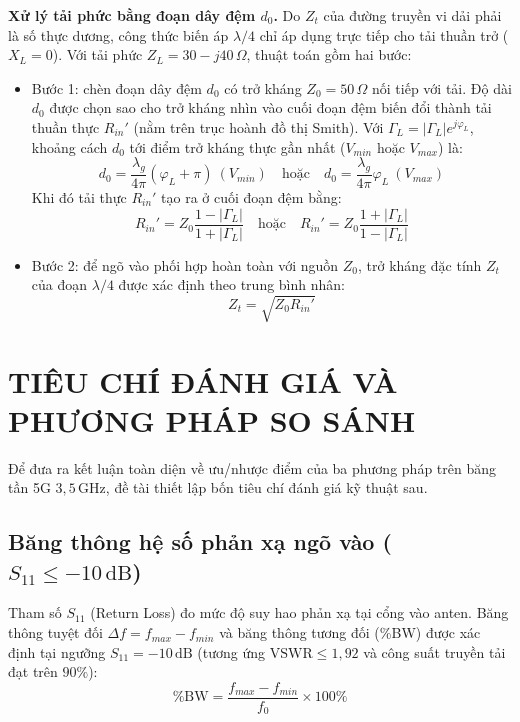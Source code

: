 \documentclass[a4paper]{report}
\newcommand\Zo{Z_0}
\newcommand\ZL{Z_L}
\newcommand\GL{\Gamma_L}
\newcommand\dB{\,\mathrm{dB}}
\newcommand\GHz{\,\mathrm{GHz}}
\begin{document}
\textbf{Xử lý tải phức bằng đoạn dây đệm $d_0$.} Do $Z_t$ của đường truyền vi dải phải là số thực dương, công thức biến áp $\lambda/4$ chỉ áp dụng trực tiếp cho tải thuần trở ($X_L=0$). Với tải phức $\ZL=30-j40\,\Omega$, thuật toán gồm hai bước:
\begin{itemize}
  \item Bước 1: chèn đoạn dây đệm $d_0$ có trở kháng $\Zo=50\,\Omega$ nối tiếp với tải. Độ dài $d_0$ được chọn sao cho trở kháng nhìn vào cuối đoạn đệm biến đổi thành tải thuần thực $R_{in}'$ (nằm trên trục hoành đồ thị Smith). Với $\GL=|\GL|e^{j\varphi_L}$, khoảng cách $d_0$ tới điểm trở kháng thực gần nhất ($V_{min}$ hoặc $V_{max}$) là:
  \begin{equation}
    d_0=\frac{\lambda_g}{4\pi}\left(\varphi_L+\pi\right)\ (V_{min})\quad\text{hoặc}\quad d_0=\frac{\lambda_g}{4\pi}\varphi_L\ (V_{max})
  \end{equation}
  Khi đó tải thực $R_{in}'$ tạo ra ở cuối đoạn đệm bằng:
  \begin{equation}
    R_{in}'=\Zo\frac{1-|\GL|}{1+|\GL|}\quad\text{hoặc}\quad R_{in}'=\Zo\frac{1+|\GL|}{1-|\GL|}
  \end{equation}
  \item Bước 2: để ngõ vào phối hợp hoàn toàn với nguồn $\Zo$, trở kháng đặc tính $Z_t$ của đoạn $\lambda/4$ được xác định theo trung bình nhân:
  \begin{equation}
    Z_t=\sqrt{\Zo R_{in}'}
  \end{equation}
\end{itemize}

\section{TIÊU CHÍ ĐÁNH GIÁ VÀ PHƯƠNG PHÁP SO SÁNH}
Để đưa ra kết luận toàn diện về ưu/nhược điểm của ba phương pháp trên băng tần 5G $3{,}5\GHz$, đề tài thiết lập bốn tiêu chí đánh giá kỹ thuật sau.

\subsection{Băng thông hệ số phản xạ ngõ vào ($S_{11}\le-10\dB$)}
Tham số $S_{11}$ (Return Loss) đo mức độ suy hao phản xạ tại cổng vào anten. Băng thông tuyệt đối $\Delta f=f_{max}-f_{min}$ và băng thông tương đối (\%BW) được xác định tại ngưỡng $S_{11}=-10\dB$ (tương ứng $\mathrm{VSWR}\le1{,}92$ và công suất truyền tải đạt trên $90\%$):
\begin{equation}
  \%\mathrm{BW}=\frac{f_{max}-f_{min}}{f_0}\times100\%
\end{equation}
\end{document}
